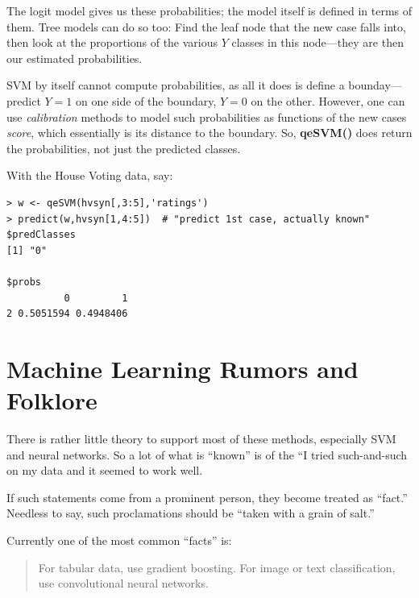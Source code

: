 The logit model gives us these probabilities; the model itself is
defined in terms of them.  Tree models can do so too:  Find the leaf
node that the new case falls into, then look at the proportions of the
various $Y$ classes in this node---they are then our estimated
probabilities.

SVM by itself cannot compute probabilities, as all it does is define a
bounday---predict $Y = 1$ on one side of the boundary, $Y = 0$ on the
other.  However, one can use \textit{calibration} methods to model such
probabilities as functions of the new cases \textit{score}, which
essentially is its distance to the boundary.  So, \textbf{qeSVM()} does
return the probabilities, not just the predicted classes.

With the House Voting data, say:

\begin{lstlisting}
> w <- qeSVM(hvsyn[,3:5],'ratings')
> predict(w,hvsyn[1,4:5])  # "predict 1st case, actually known"
$predClasses
[1] "0"

$probs
          0         1
2 0.5051594 0.4948406

\end{lstlisting}

\section{Machine Learning Rumors and Folklore}

There is rather little theory to support most of these methods,
especially SVM and neural networks.  So a lot of what is ``known'' is of
the ``I tried such-and-such on my data and it seemed to work well.

If such statements come from a prominent person, they become treated as
``fact.''  Needless to say, such proclamations should be ``taken with a
grain of salt.''

Currently one of the most common ``facts'' is:

\begin{quote}

For tabular data, use gradient boosting.  For image or text
classification, use convolutional neural networks.

\end{quote}



